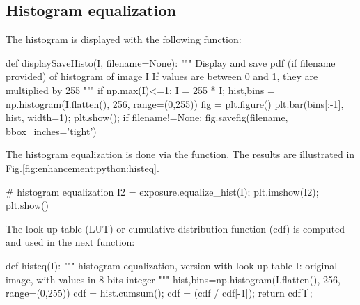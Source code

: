 \subsection{Histogram equalization}
The histogram is displayed with the following function:
\begin{python}
def displaySaveHisto(I, filename=None):
    """
    Display and save pdf (if filename provided) of histogram of image I
    If values are between 0 and 1, they are multiplied by 255
    """
    if np.max(I)<=1:
        I = 255 * I;
    hist,bins = np.histogram(I.flatten(), 256, range=(0,255))
    fig = plt.figure()
    plt.bar(bins[:-1], hist, width=1);
    plt.show();
    if filename!=None:
        fig.savefig(filename, bbox_inches='tight')
\end{python}

The histogram equalization is done via the  function. The results are illustrated in Fig.\ref{fig:enhancement:python:histeq}.

\begin{python}
# histogram equalization
I2 = exposure.equalize_hist(I);
plt.imshow(I2);
plt.show()
\end{python}

The look-up-table (LUT) or cumulative distribution function (cdf) is computed and used in the next function:
\begin{python}
def histeq(I):
    """
    histogram equalization, version with look-up-table
    I: original image, with values in 8 bits integer
    """
    hist,bins=np.histogram(I.flatten(), 256, range=(0,255))
    cdf = hist.cumsum();
    cdf = (cdf / cdf[-1]);
    return cdf[I];
\end{python}

\vspace*{-0.5cm}

